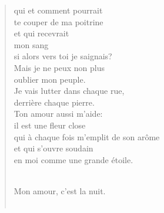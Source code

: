 \documentclass[11pt,a4paper]{book}
\begin{document}
\begin{verse}
qui et comment pourrait \\
te couper de ma poitrine \\
et qui recevrait \\
mon sang \\
si alors vers toi je saignais? \\
Mais je ne peux non plus \\
oublier mon peuple. \\
Je vais lutter dans chaque rue, \\
derrière chaque pierre. \\
Ton amour aussi m'aide: \\
il est une fleur close \\
qui à chaque fois m'emplit de son arôme \\
et qui s'ouvre soudain \\
en moi comme une grande étoile. \\ \

Mon amour, c'est la nuit. \\ \


\end{verse}
\end{document}
